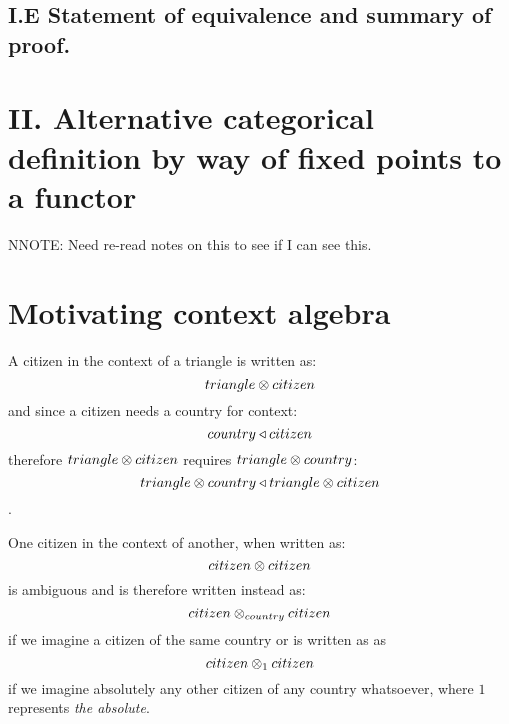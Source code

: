 \documentclass[10pt,a4paper]{scrartcl}
\begin{document}
\subsection{I.E Statement of equivalence and summary of proof.}

\section{II. Alternative categorical definition by way of fixed points to a functor}
NNOTE: Need re-read notes on this to see if I can see this.
\section{Motivating context algebra}
A citizen in the context of a triangle is written as:
$$
triangle \otimes citizen
$$
and since a citizen needs a country for context:
$$
country \triangleleft citizen
$$
 therefore $triangle \otimes citizen$ requires $triangle \otimes country$:
$$ triangle \otimes country \triangleleft triangle \otimes citizen$$.



One citizen in the context of another, when written as:
$$citizen \otimes citizen$$
is ambiguous and is therefore written instead as:
$$citizen \otimes_{country} citizen$$
if we imagine a citizen of the same country or is written as as
$$citizen \otimes_1 citizen$$
if we imagine absolutely any other citizen of any country whatsoever, 
where $1$ represents \textit{the absolute}. 
\end{document}
